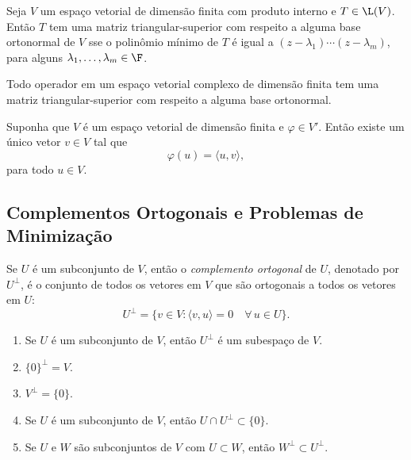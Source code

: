 \documentclass{article}
\begin{document}
\begin{prop}
    Seja \(V\) um espaço vetorial de dimensão finita com produto interno e \(T \in \L(V)\). Então \(T\) tem uma matriz triangular-superior com respeito a alguma base ortonormal de \(V\) sse o polinômio mínimo de \(T\) é igual a \((z - \lambda_1) \cdots (z - \lambda_m)\), para alguns \(\lambda_1, \ldots, \lambda_m \in \F\).
\end{prop}

\begin{thm} 
    Todo operador em um espaço vetorial complexo de dimensão finita tem uma matriz triangular-superior com respeito a alguma base ortonormal.
\end{thm}

\begin{thm} 
    Suponha que \(V\) é um espaço vetorial de dimensão finita e \(\varphi \in V'\). Então existe um único vetor \(v \in V\) tal que
    \[
        \varphi(u) = \langle u, v \rangle,
    \]
    para todo \(u \in V\).
\end{thm}

\subsection{Complementos Ortogonais e Problemas de Minimização}

\begin{defn}
    Se \(U\) é um subconjunto de \(V\), então o \emph{complemento ortogonal} de \(U\), denotado por \(U^\perp\), é o conjunto de todos os vetores em \(V\) que são ortogonais a todos os vetores em \(U\):
    \[
        U^\perp = \{v \in V : \langle v, u \rangle = 0 \quad \forall\,  u \in U\}.
    \]
\end{defn}

\begin{prop}  
    \begin{enumerate}
        \item [(a)] Se \(U\) é um subconjunto de \(V\), então \(U^\perp\) é um subespaço de \(V\).
        \item [(b)] \(\{0\}^\perp = V\).
        \item [(c)] \(V^\perp = \{0\}\).
        \item [(d)] Se \(U\) é um subconjunto de \(V\), então \(U \cap U^\perp \subset \{0\}\).
        \item [(e)] Se \(U\) e \(W\) são subconjuntos de \(V\) com \(U \subset W\), então \(W^\perp \subset U^\perp\).
    \end{enumerate}
\end{prop}
\end{document}
